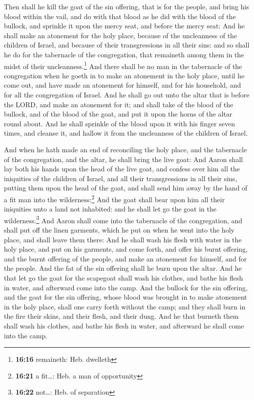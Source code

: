 Then shall he kill the goat of the sin offering, that is
for the people, and bring his blood within the vail, and do with that
blood as he did with the blood of the bullock, and sprinkle it upon the
mercy seat, and before the mercy seat:  And he shall make
an atonement for the holy place, because of the uncleanness of the
children of Israel, and because of their transgressions in all their
sins: and so shall he do for the tabernacle of the congregation, that
remaineth among them in the midst of their uncleanness.\footnote{\textbf{16:16}
  remaineth: Heb. dwelleth}  And there shall be no man in
the tabernacle of the congregation when he goeth in to make an atonement
in the holy place, until he come out, and have made an atonement for
himself, and for his household, and for all the congregation of Israel.
 And he shall go out unto the altar that is before the
LORD, and make an atonement for it; and shall take of the blood of the
bullock, and of the blood of the goat, and put it upon the horns of the
altar round about.  And he shall sprinkle of the blood
upon it with his finger seven times, and cleanse it, and hallow it from
the uncleanness of the children of Israel.

 And when he hath made an end of reconciling the holy
place, and the tabernacle of the congregation, and the altar, he shall
bring the live goat:  And Aaron shall lay both his hands
upon the head of the live goat, and confess over him all the iniquities
of the children of Israel, and all their transgressions in all their
sins, putting them upon the head of the goat, and shall send him away by
the hand of a fit man into the wilderness:\footnote{\textbf{16:21} a
  fit\ldots: Heb. a man of opportunity}  And the goat
shall bear upon him all their iniquities unto a land not inhabited: and
he shall let go the goat in the wilderness.\footnote{\textbf{16:22}
  not\ldots: Heb. of separation}  And Aaron shall come
into the tabernacle of the congregation, and shall put off the linen
garments, which he put on when he went into the holy place, and shall
leave them there:  And he shall wash his flesh with water
in the holy place, and put on his garments, and come forth, and offer
his burnt offering, and the burnt offering of the people, and make an
atonement for himself, and for the people.  And the fat
of the sin offering shall he burn upon the altar.  And he
that let go the goat for the scapegoat shall wash his clothes, and bathe
his flesh in water, and afterward come into the camp. 
And the bullock for the sin offering, and the goat for the sin offering,
whose blood was brought in to make atonement in the holy place, shall
one carry forth without the camp; and they shall burn in the fire their
skins, and their flesh, and their dung.  And he that
burneth them shall wash his clothes, and bathe his flesh in water, and
afterward he shall come into the camp.

